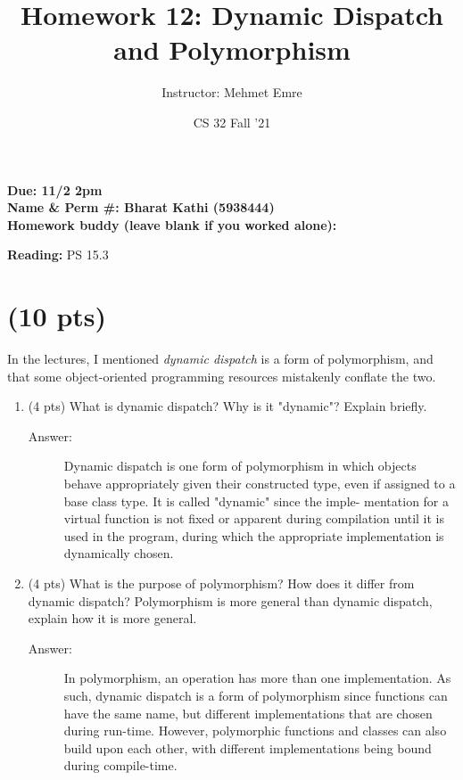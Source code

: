 \documentclass[11pt]{article}
\author{Instructor: Mehmet Emre}
\date{CS 32 Fall '21}
\title{Homework 12: Dynamic Dispatch and Polymorphism}
\begin{document}
\maketitle
\textbf{Due: 11/2 2pm} \\ 
\vspace{1em}
\textbf{Name \& Perm \#: Bharat Kathi (5938444)} \\ 
\textbf{Homework buddy (leave blank if you worked alone):}

\textbf{Reading:} PS 15.3

\section{(10 pts)}
\label{sec:org529e27b}

In the lectures, I mentioned \emph{dynamic dispatch} is a form of polymorphism, and
that some object-oriented programming resources mistakenly conflate the two.

\begin{enumerate}
\item (4 pts) What is dynamic dispatch? Why is it "dynamic"? Explain briefly.

\begin{description}
    \item[Answer:] Dynamic dispatch is one form of polymorphism in which objects behave appropriately given their constructed type, even if assigned to a base class type. It is called "dynamic" since the imple- mentation for a virtual function is not fixed or apparent during compilation until it is used in the program, during which the appropriate implementation is dynamically chosen.
\end{description}

\item (4 pts) What is the purpose of polymorphism? How does it differ from
dynamic dispatch? Polymorphism is more general than dynamic dispatch,
explain how it is more general.

\begin{description}
    \item[Answer:] In polymorphism, an operation has more than one implementation. As such, dynamic dispatch is a form of polymorphism since functions can have the same name, but different implementations that are chosen during run-time. However, polymorphic functions and classes can also build upon each other, with different implementations being bound during compile-time.
\end{description}

\end{enumerate}
\end{document}
